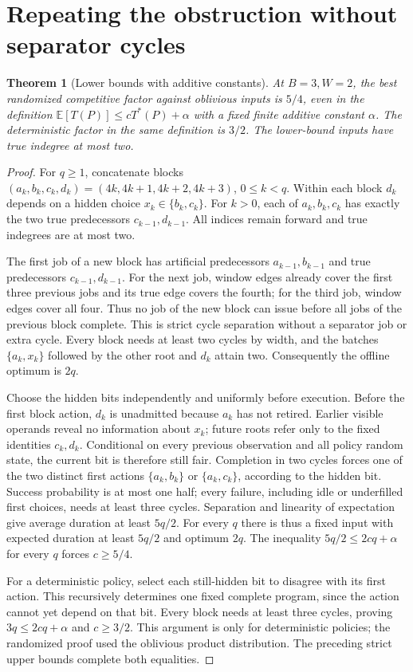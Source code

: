 \documentclass[11pt]{article}
\newtheorem{theorem}{Theorem}
\newcommand{\T}{T^*}
\begin{document}
\section{Repeating the obstruction without separator cycles}
\begin{theorem}[Lower bounds with additive constants]
At $B=3,W=2$, the best randomized competitive factor against oblivious
inputs is $5/4$, even in the definition
$\mathbb E[T(P)]\le c\T(P)+\alpha$ with a fixed finite additive constant
$\alpha$. The deterministic factor in the same definition is $3/2$.
The lower-bound inputs have true indegree at most two.
\end{theorem}
\begin{proof}
For $q\ge1$, concatenate blocks
$(a_k,b_k,c_k,d_k)=(4k,4k+1,4k+2,4k+3)$, $0\le k<q$.
Within each block $d_k$ depends on a hidden choice $x_k\in\{b_k,c_k\}$.
For $k>0$, each of $a_k,b_k,c_k$ has exactly the two true predecessors
$c_{k-1},d_{k-1}$. All indices remain forward and true indegrees are at
most two.

The first job of a new block has artificial predecessors $a_{k-1},b_{k-1}$
and true predecessors $c_{k-1},d_{k-1}$. For the next job, window edges
already cover the first three previous jobs and its true edge covers the
fourth; for the third job, window edges cover all four. Thus no job of
the new block can issue before all jobs of the previous block complete.
This is strict cycle separation without a separator job or extra cycle.
Every block needs at least two cycles by width, and the batches
$\{a_k,x_k\}$ followed by the other root and $d_k$ attain two.
Consequently the offline optimum is $2q$.

Choose the hidden bits independently and uniformly before execution.
Before the first block action, $d_k$ is unadmitted because $a_k$ has not
retired. Earlier visible operands reveal no information about $x_k$;
future roots refer only to the fixed identities $c_k,d_k$. Conditional
on every previous observation and all policy random state, the current
bit is therefore still fair. Completion in two cycles forces one of the
two distinct first actions $\{a_k,b_k\}$ or $\{a_k,c_k\}$, according to
the hidden bit. Success probability is at most one half; every failure,
including idle or underfilled first choices, needs at least three cycles.
Separation and linearity of expectation give average duration at least
$5q/2$. For every $q$ there is thus a fixed input with expected duration
at least $5q/2$ and optimum $2q$. The inequality
$5q/2\le2cq+\alpha$ for every $q$ forces $c\ge5/4$.

For a deterministic policy, select each still-hidden bit to disagree
with its first action. This recursively determines one fixed complete
program, since the action cannot yet depend on that bit. Every block
needs at least three cycles, proving $3q\le2cq+\alpha$ and $c\ge3/2$.
This argument is only for deterministic policies; the randomized proof
used the oblivious product distribution. The preceding strict upper
bounds complete both equalities.
\end{proof}
\end{document}
